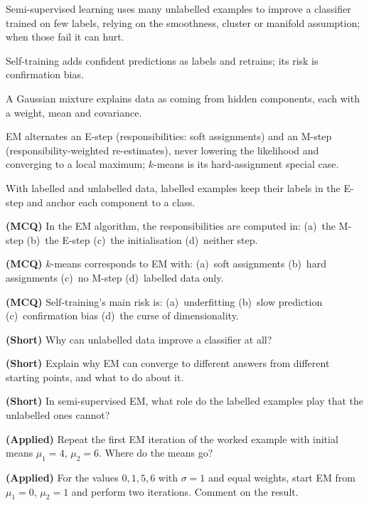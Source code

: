 \begin{chaptersummary}
\begin{tight}
  \item Semi-supervised learning uses many unlabelled examples to improve a
        classifier trained on few labels, relying on the smoothness, cluster or
        manifold assumption; when those fail it can hurt.
  \item Self-training adds confident predictions as labels and retrains; its risk is
        confirmation bias.
  \item A Gaussian mixture explains data as coming from hidden components, each with
        a weight, mean and covariance.
  \item EM alternates an E-step (responsibilities: soft assignments) and an M-step
        (responsibility-weighted re-estimates), never lowering the likelihood and
        converging to a local maximum; $k$-means is its hard-assignment special case.
  \item With labelled and unlabelled data, labelled examples keep their labels in
        the E-step and anchor each component to a class.
\end{tight}
\end{chaptersummary}

\begin{reviewq}
  \item \textbf{(MCQ)} In the EM algorithm, the responsibilities are computed in:
        (a)~the M-step (b)~the E-step (c)~the initialisation (d)~neither step.
  \item \textbf{(MCQ)} $k$-means corresponds to EM with: (a)~soft assignments
        (b)~hard assignments (c)~no M-step (d)~labelled data only.
  \item \textbf{(MCQ)} Self-training's main risk is: (a)~underfitting (b)~slow
        prediction (c)~confirmation bias (d)~the curse of dimensionality.
  \item \textbf{(Short)} Why can unlabelled data improve a classifier at all?
  \item \textbf{(Short)} Explain why EM can converge to different answers from
        different starting points, and what to do about it.
  \item \textbf{(Short)} In semi-supervised EM, what role do the labelled examples
        play that the unlabelled ones cannot?
  \item \textbf{(Applied)} Repeat the first EM iteration of the worked example with
        initial means $\mu_1 = 4$, $\mu_2 = 6$. Where do the means go?
  \item \textbf{(Applied)} For the values $0, 1, 5, 6$ with $\sigma = 1$ and equal
        weights, start EM from $\mu_1 = 0$, $\mu_2 = 1$ and perform two iterations.
        Comment on the result.
\end{reviewq}
